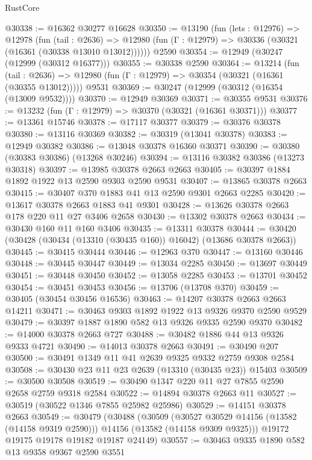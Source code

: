 \begin{lexlean}{RustCore}
\begin{coremodule}
@30338 := @16362 @30277 @16628
@30350 := @13190
    (fun (lets : @12976) =>
    @12978
      (fun (tail : @2636) =>
      @12980 (fun (Γ : @12979) => @30336 (@30321 (@16361 (@30338 @13010 @13012))))))
    @2590
@30354 := @12949 (@30247 (@12999 (@30312 @16377)))
@30355 := @30338 @2590
@30364 := @13214
    (fun (tail : @2636) => @12980 (fun (Γ : @12979) => @30354 (@30321 (@16361 (@30355 @13012)))))
    @9531
@30369 := @30247 (@12999 (@30312 (@16354 (@13009 @9532))))
@30370 := @12949 @30369
@30371 := @30355 @9531
@30376 := @13232 (fun (Γ : @12979) => @30370 (@30321 (@16361 @30371)))
@30377 := @13361 @15746
@30378 := @17117 @30377
@30379 := @30376 @30378
@30380 := @13116 @30369
@30382 := @30319 (@13041 @30378)
@30383 := @12949 @30382
@30386 := @13048 @30378 @16360 @30371
@30390 := @30380 (@30383 @30386) (@13268 @30246)
@30394 := @13116 @30382 @30386 (@13273 @30318)
@30397 := @13985 @30378 @2663 @2663
@30405 := @30397 @1884 @1892 @1922 @13 @2590 @9303 @2590 @9531
@30407 := @13865 @30378 @2663
@30415 := @30407 @370 @1883 @41 @13 @2590 @9301 @2663 @2285
@30420 := @13617 @30378 @2663 @1883 @41 @9301
@30428 := @13626 @30378 @2663 @178 @220 @11 @27 @3406 @2658
@30430 := @13302 @30378 @2663
@30434 := @30430 @160 @11 @160 @3406
@30435 := @13311 @30378
@30444 := @30420 (@30428 (@30434 (@13310 (@30435 @160)) @16042) (@13686 @30378 @2663))
@30445 := @30415 @30444
@30446 := @12963 @370
@30447 := @13160 @30446
@30448 := @30445 @30447
@30449 := @13034 @2285
@30450 := @13697 @30449
@30451 := @30448 @30450
@30452 := @13058 @2285
@30453 := @13701 @30452
@30454 := @30451 @30453
@30456 := @13706 (@13708 @370)
@30459 := @30405 (@30454 @30456 @16536)
@30463 := @14207 @30378 @2663 @2663 @14211
@30471 := @30463 @9303 @1892 @1922 @13 @9326 @9370 @2590 @9529
@30479 := @30397 @1887 @1890 @582 @13 @9326 @9335 @2590 @9370
@30482 := @14000 @30378 @2663 @727
@30488 := @30482 @1886 @44 @13 @9326 @9333 @4721
@30490 := @14013 @30378 @2663
@30491 := @30490 @207
@30500 := @30491 @1349 @11 @41 @2639 @9325 @9332 @2759 @9308 @2584
@30508 := @30430 @23 @11 @23 @2639 (@13310 (@30435 @23)) @15403
@30509 := @30500 @30508
@30519 := @30490 @1347 @220 @11 @27 @7855 @2590 @2658 @2759 @9318 @2584
@30522 := @14894 @30378 @2663 @11
@30527 := @30519 (@30522 @1346 @7855 @25982 @25986)
@30529 := @14151 @30378 @2663
@30549 := @30479
    (@30488
      (@30509
        (@30527 @30529 @14156 (@13582 (@14158 @9319 @2590)))
        @14156
        (@13582 (@14158 @9309 @9325)))
      @19172
      @19175
      @19178
      @19182
      @19187
      @24149)
@30557 := @30463 @9335 @1890 @582 @13 @9358 @9367 @2590 @3551

\end{coremodule}
\end{lexlean}
